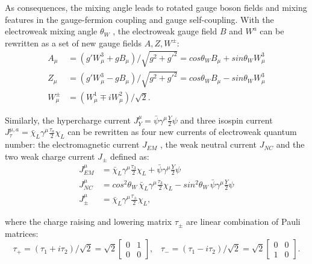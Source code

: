 \noindent As consequences, the mixing angle leads to rotated gauge boson fields and mixing features in the gauge-fermion coupling and gauge self-coupling. With the electroweak mixing angle $\theta_W$ , the electroweak gauge field $B$ and $W^{a}$ can be rewritten as a set of new gauge fields $A,Z,W^\pm$:
\begin{align}
    A_\mu &= (g'W_\mu^3 + gB_\mu)/\sqrt{g^2+g'^2} = cos\theta_WB_\mu  + sin\theta_W W_\mu^3 \\
    Z_\mu &= (g'W_\mu^3 - gB_\mu)/\sqrt{g^2+g'^2} = cos\theta_WB_\mu  - sin\theta_W W_\mu^3\\
    W^\pm_\mu &= (W_\mu^1 \mp iW_\mu^2)/\sqrt{2}.
\end{align} 

\noindent Similarly, the hypercharge current $J^\mu_Y = \bar{\psi}  \gamma^\mu \frac{Y}{2} \psi$  and three isospin current $J^{\mu,a} _\tau = \bar{\chi}_L  \gamma^\mu \frac{\tau_{a}}{2}  \chi_L$ can be rewritten as four new currents of electroweak quantum number: the electromagnetic current $J_{EM}$ , the weak neutral current $J_{NC}$ and the two weak charge current $J_{\pm}$ defined as:
\begin{align}
    J^{\mu}_{EM} &= \bar{\chi}_L \gamma^\mu   \frac{\tau_3}{2} \chi_L + \bar{\psi} \gamma^\mu   \frac{Y}{2} \psi \\
    J^{\mu}_{NC} &= cos^2\theta_W \,  \bar{\chi}_L \gamma^\mu   \frac{\tau_3}{2} \chi_L - sin^2 \theta_W \,  \bar{\psi} \gamma^\mu   \frac{Y}{2} \psi \\
    J^{\mu}_{\pm}&= \bar{\chi}_L  \gamma^\mu \frac{\tau_\pm}{2} \chi_L ,
\end{align}


\noindent where the charge raising and lowering matrix $\tau_{\pm}$ are linear combination of Pauli matrices:
\begin{equation}
    \tau_+ = (\tau_1+i\tau_2)/\sqrt{2} = \sqrt{2} \begin{bmatrix} 0 & 1 \\ 0 & 0\end{bmatrix} , \;\;\; \tau_- = (\tau_1-i\tau_2)/\sqrt{2} = \sqrt{2} \begin{bmatrix} 0 & 0 \\ 1 & 0\end{bmatrix} .
\end{equation}

